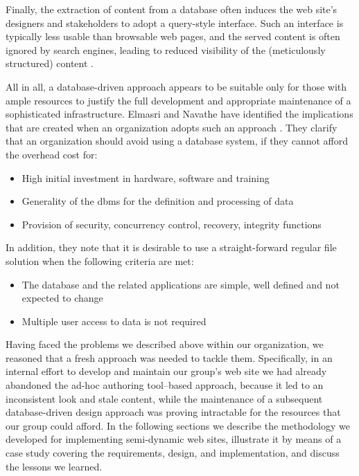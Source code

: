 \documentclass{elsart}
\begin{document}
Finally, the extraction of content from a database often
induces the web site's designers and stakeholders to adopt a
query-style interface.
Such an interface is typically less usable than browsable web pages,
and the served content is often ignored by search engines,
leading to reduced visibility
of the (meticulously structured) content \cite{DEEP_WEB,JP04}.

All in all, a database-driven approach appears to be suitable
only for those with ample resources to justify the full
development and appropriate maintenance of a sophisticated infrastructure.
Elmasri and Navathe have identified the implications that are created when an organization
adopts such an approach \cite{EN00}. They clarify that an organization should avoid
using a database system, if they cannot afford the overhead cost for:

\begin{itemize}
	\item High initial investment in hardware, software and training

	\item Generality of the {\sc dbms} for the definition and processing of data

	\item Provision of security, concurrency control, recovery, integrity functions
\end{itemize}

In addition, they note that it is desirable to use a straight-forward regular file solution when the following criteria are met:

\begin{itemize}
	\item The database and the related applications are simple, well defined and not expected to change

	\item Multiple user access to data is not required
\end{itemize}

Having faced the problems we described above within our organization,
we reasoned that a fresh approach was needed to tackle them.
Specifically,
in an internal effort to develop and maintain our group's web site
we had already abandoned the ad-hoc authoring tool--based approach,
because it led to an inconsistent look and stale content,
while the maintenance of a subsequent database-driven
design approach was proving intractable for the resources that
our group could afford.
In the following sections we describe the methodology we developed
for implementing semi-dynamic web sites,
illustrate it by means
of a case study covering the requirements, design, and implementation,
and discuss the lessons we learned.
\end{document}
